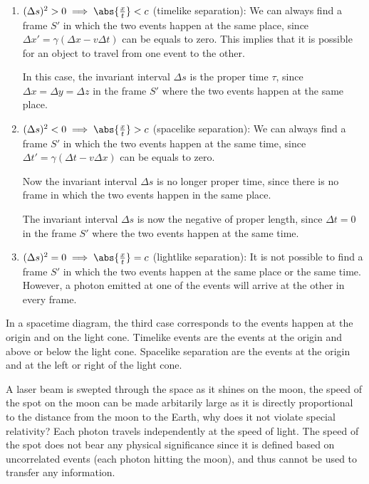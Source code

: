 \documentclass[english,a4paper,12pt]{report}
\begin{document}
\begin{enumerate}
    \item \((\Delta s)^2 > 0 \implies \abs{\frac{x}{t} } < c \) (timelike separation): We can always find a frame \(S'\) in which the two events happen at the same place, since \(\Delta x' = \gamma (\Delta x - v\Delta t)\) can be equals to zero. This implies that it is possible for an object to travel from one event to the other.  
    
    In this case, the invariant interval \(\Delta s\) is the proper time \(\tau \), since \(\Delta x = \Delta y = \Delta z\) in the frame \(S'\) where the two events happen at the same place.    

    \item \((\Delta s)^2 < 0 \implies \abs{\frac{x}{t} } > c \) (spacelike separation): We can always find a frame \(S'\) in which the two events happen at the same time, since \(\Delta t' = \gamma (\Delta t - v\Delta x)\) can be equals to zero.
    
    Now the invariant interval \(\Delta s\) is no longer proper time, since there is no frame in which the two events happen in the same place. 
    
    The invariant interval \(\Delta s\) is now the negative of proper length, since \(\Delta t = 0\) in the frame \(S'\) where the two events happen at the same time.
    
    \item \((\Delta s)^2 = 0 \implies \abs{\frac{x}{t} } = c \) (lightlike separation): It is not possible to find a frame \(S'\) in which the two events happen at the same place or the same time. However, a photon emitted at one of the events will arrive at the other in every frame.       
\end{enumerate}

In a spacetime diagram, the third case corresponds to the events happen at the origin and on the light cone. Timelike events are the events at the origin and above or below the light cone. Spacelike separation are the events at the origin and at the left or right of the light cone.


{A laser beam is swepted through the space as it shines on the moon, the speed of the spot on the moon can be made arbitarily large as it is directly proportional to the distance from the moon to the Earth, why does it not violate special relativity?}
{Each photon travels independently at the speed of light. The speed of the spot does not bear any physical significance since it is defined based on uncorrelated events (each photon hitting the moon), and thus cannot be used to transfer any information.} 
\end{document}

